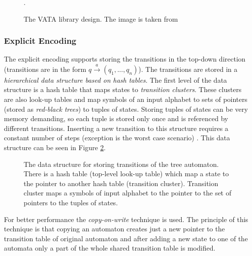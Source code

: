 \begin{figure}[bt]
\begin{center}

		\caption{The VATA library design. The image is taken from \cite{libvata}}.
		\label{picVataDesign}
\end{center}
\end{figure}

\subsubsection{Explicit Encoding}
\label{sectionExplicitEnc}
The explicit encoding supports storing the transitions in the top-down direction (transitions are in the form $q \xrightarrow{a} (q_1,...,q_n)$). The transitions
are stored in a \emph{hierarchical data structure based on hash tables}. The first level of the data structure is a hash table
that maps states to \emph{transition clusters}. These clusters are also look-up tables and map symbols of an input alphabet
to sets of pointers (stored as \emph{red-black trees}) to tuples of states. Storing tuples of states can be very memory demanding, so each tuple is stored
only once and is referenced by different transitions. 
Inserting a new transition to this structure requires a constant number of steps (exception is the worst case scenario) %
\cite{libvata}. This data structure can be seen in Figure \ref{figExplicitTreeDataStr}.

\begin{figure}[bt]
\begin{center}

    \caption{The data structure for storing transitions of the tree automaton. There is a hash table (top-level look-up table) 
      which map a state to the pointer to another hash table (transition cluster). Transition cluster
      maps a symbols of input alphabet to the pointer to the set of pointers to the tuples of states.}
		\label{figExplicitTreeDataStr}
\end{center}
\end{figure}


For better performance the \emph{copy-on-write} technique \cite{libvata} is used. The principle of this technique is 
that copying an automaton creates just a new pointer to the transition table of original automaton and after adding a new state to one of the automata 
only a part of the whole shared transition table is modified. 

